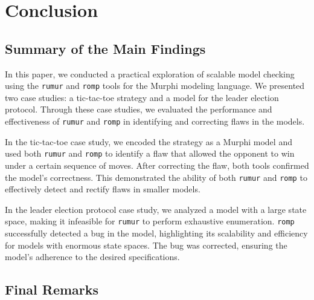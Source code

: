 
\section{Conclusion}\label{sec:conclusion}

\subsection{Summary of the Main Findings}\label{subsec:summary-of-the-main-findings}

In this paper, we conducted a practical exploration of scalable model
checking using the \texttt{rumur} and \texttt{romp} tools for the Murphi
modeling language.
We presented two case studies: a tic-tac-toe strategy and a model for the
leader election protocol.
Through these case studies, we evaluated the performance and effectiveness of
\texttt{rumur} and \texttt{romp} in identifying and correcting flaws in the
models.

In the tic-tac-toe case study, we encoded the strategy as a Murphi model and
used both \texttt{rumur} and \texttt{romp} to identify a flaw that allowed
the opponent to win under a certain sequence of moves.
After correcting the flaw, both tools confirmed the model's correctness.
This demonstrated the ability of both \texttt{rumur} and \texttt{romp} to
effectively detect and rectify flaws in smaller models.

In the leader election protocol case study,
we analyzed a model with a large state space,
making it infeasible for \texttt{rumur} to perform exhaustive enumeration.
\texttt{romp} successfully detected a bug in the model,
highlighting its scalability and efficiency for models with enormous
state spaces.
The bug was corrected, ensuring the model's adherence to the desired
specifications.

\subsection{Final Remarks}\label{subsec:final-remarks}

